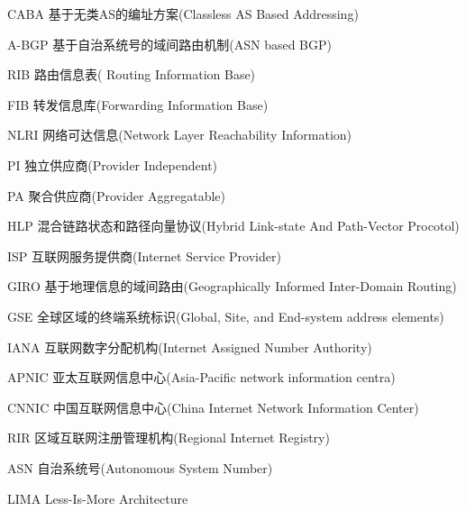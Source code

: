 \begin{denotation}

\item[CABA]  基于无类AS的编址方案(Classless AS Based Addressing)
\item[A-BGP] 基于自治系统号的域间路由机制(ASN based BGP)
\item[RIB] 路由信息表( Routing Information Base)
\item[FIB] 转发信息库(Forwarding Information Base)
\item[NLRI] 网络可达信息(Network Layer Reachability Information)
\item[PI] 独立供应商(Provider Independent)
\item[PA] 聚合供应商(Provider Aggregatable)
\item[HLP] 混合链路状态和路径向量协议(Hybrid Link-state And Path-Vector Procotol)
\item[ISP] 互联网服务提供商(Internet Service Provider)
\item[GIRO] 基于地理信息的域间路由(Geographically Informed Inter-Domain Routing)
\item[GSE] 全球区域的终端系统标识(Global, Site, and End-system address elements)
\item[IANA] 互联网数字分配机构(Internet Assigned Number Authority) 
\item[APNIC] 亚太互联网信息中心(Asia-Pacific network information centra) 
\item[CNNIC] 中国互联网信息中心(China Internet Network Information Center) 
\item[RIR] 区域互联网注册管理机构(Regional Internet Registry)
\item[ASN] 自治系统号(Autonomous System Number)
\item[LIMA] Less-Is-More Architecture

\end{denotation}
